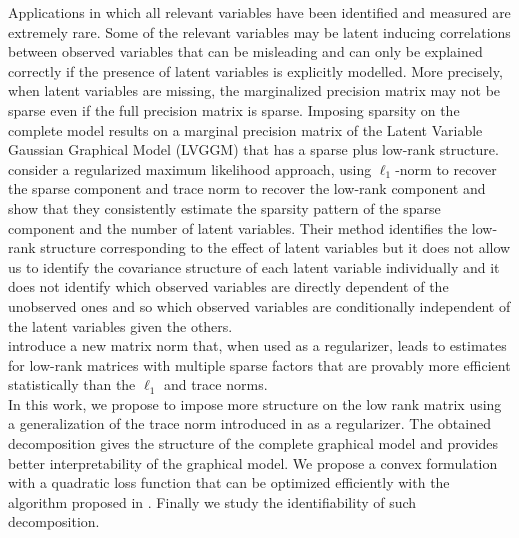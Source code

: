 \documentclass[letterpaper]{article}
\begin{document}
Applications in which all relevant variables have been identified and measured are extremely rare. Some of the relevant variables may be latent inducing correlations between observed variables that can be misleading and can only be explained correctly if the presence of latent variables is explicitly modelled. More precisely, when latent variables are missing, the marginalized precision matrix may not be sparse even if the full precision matrix is sparse. Imposing sparsity on the complete model results on a marginal precision matrix of the Latent Variable Gaussian Graphical Model (LVGGM) that has a sparse plus low-rank structure. \citet{chandrasekaran2010} consider a regularized maximum likelihood approach, using $\ell_1$-norm to recover the sparse component and trace norm to recover the low-rank component and show that they consistently estimate the sparsity pattern of the sparse component and the number of latent variables. Their method identifies the low-rank structure corresponding to the effect of latent variables but it does not allow us to identify the covariance structure of each latent variable individually and it does not identify which observed variables are directly dependent of the unobserved ones and so which observed variables are conditionally independent of the latent variables given the others.\\



\citet{richard2014tight} introduce a new matrix norm that, when used as a regularizer, leads to  estimates for low-rank matrices with multiple sparse factors that are provably more efficient statistically than the $\ell_1$ and trace norms.\\

In this work, we propose to impose more structure on the low rank matrix using a generalization of the trace norm introduced in \citet{richard2014tight} as a regularizer. The obtained decomposition gives the structure of the complete graphical model and provides better interpretability of the graphical model. We propose a convex formulation with a quadratic loss function that can be optimized efficiently with the algorithm proposed in \citet{vinyes2017}.  Finally we study the identifiability of such decomposition.\\
\end{document}
